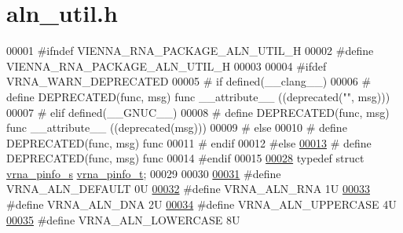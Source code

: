 \hypertarget{aln__util_8h_source}{}\section{aln\+\_\+util.\+h}
\label{aln__util_8h_source}

\begin{DoxyCode}
00001 \textcolor{preprocessor}{#ifndef VIENNA\_RNA\_PACKAGE\_ALN\_UTIL\_H}
00002 \textcolor{preprocessor}{#define VIENNA\_RNA\_PACKAGE\_ALN\_UTIL\_H}
00003 
00004 \textcolor{preprocessor}{#ifdef VRNA\_WARN\_DEPRECATED}
00005 \textcolor{preprocessor}{# if defined(\_\_clang\_\_)}
00006 \textcolor{preprocessor}{#  define DEPRECATED(func, msg) func \_\_attribute\_\_ ((deprecated("", msg)))}
00007 \textcolor{preprocessor}{# elif defined(\_\_GNUC\_\_)}
00008 \textcolor{preprocessor}{#  define DEPRECATED(func, msg) func \_\_attribute\_\_ ((deprecated(msg)))}
00009 \textcolor{preprocessor}{# else}
00010 \textcolor{preprocessor}{#  define DEPRECATED(func, msg) func}
00011 \textcolor{preprocessor}{# endif}
00012 \textcolor{preprocessor}{#else}
\mbox{\hyperlink{aln__util_8h_aab347a3c03fbe8e7319551b9fa0cce4a}{00013}} \textcolor{preprocessor}{# define DEPRECATED(func, msg) func}
00014 \textcolor{preprocessor}{#endif}
00015 
\mbox{\hyperlink{group__aln__utils_ga6660dfca23debee7306e0cd53341263f}{00028}} \textcolor{keyword}{typedef} \textcolor{keyword}{struct }\mbox{\hyperlink{group__aln__utils_structvrna__pinfo__s}{vrna\_pinfo\_s}} \mbox{\hyperlink{group__aln__utils_structvrna__pinfo__s}{vrna\_pinfo\_t}};
00029 
00030 
\mbox{\hyperlink{group__aln__utils_ga7437bcbc3142b266f1f3b086eb669092}{00031}} \textcolor{preprocessor}{#define VRNA\_ALN\_DEFAULT      0U}
\mbox{\hyperlink{group__aln__utils_ga1a2aa60bcc51dc8e48c07bf146bd28c1}{00032}} \textcolor{preprocessor}{#define VRNA\_ALN\_RNA          1U}
\mbox{\hyperlink{group__aln__utils_ga36affc310a5adedf1bdbf9669dd4bf85}{00033}} \textcolor{preprocessor}{#define VRNA\_ALN\_DNA          2U}
\mbox{\hyperlink{group__aln__utils_ga0de72fc917d72acafe862750a3a5e0bc}{00034}} \textcolor{preprocessor}{#define VRNA\_ALN\_UPPERCASE    4U}
\mbox{\hyperlink{group__aln__utils_ga27eb303be3c8368c9e8be76a4d6ca35e}{00035}} \textcolor{preprocessor}{#define VRNA\_ALN\_LOWERCASE    8U}

\end{DoxyCode}
